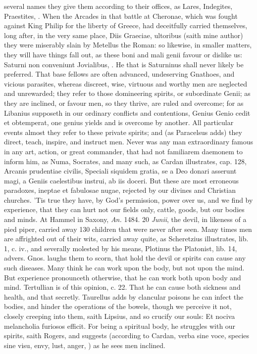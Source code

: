 {{several names they give them according to their offices, as Lares,
Indegites, Praestites, \etc{}. When the Arcades in that battle at Cheronae,
which was fought against King Philip for the liberty of Greece, had
deceitfully carried themselves, long after, in the very same place,
Diis Graeciae, ultoribus (saith mine author) they were miserably slain
by Metellus the Roman: so likewise, in smaller matters, they will have
things fall out, as these boni and mali genii favour or dislike us:
Saturni non conveniunt Jovialibus, \etc{}. He that is Saturninus shall
never likely be preferred. That base fellows are often advanced,
undeserving Gnathoes, and vicious parasites, whereas discreet, wise,
virtuous and worthy men are neglected and unrewarded; they refer to
those domineering spirits, or subordinate Genii; as they are inclined,
or favour men, so they thrive, are ruled and overcome; for as
Libanius supposeth in our ordinary conflicts and contentions,
Genius Genio cedit et obtemperat, one genius yields and is overcome by
another. All particular events almost they refer to these private
spirits; and (as Paracelsus adds) they direct, teach, inspire, and
instruct men. Never was any man extraordinary famous in any art,
action, or great commander, that had not familiarem daemonem to inform
him, as Numa, Socrates, and many such, as Cardan illustrates, cap. 128,
Arcanis prudentiae civilis,  Speciali siquidem gratia, se a Deo
donari asserunt magi, a Geniis caelestibus instrui, ab iis doceri. But
these are most erroneous paradoxes, ineptae et fabulosae nugae,
rejected by our divines and Christian churches. 'Tis true they have, by
God's permission, power over us, and we find by experience, that they
can hurt not our fields only, cattle, goods, but our bodies and
minds. At Hammel in Saxony, \emph{An.} 1484. 20 \emph{Junii}, the devil, in
likeness of a pied piper, carried away 130 children that were never
after seen. Many times men are affrighted out of their wits,
carried away quite, as Scheretzius illustrates, lib. 1, c. iv., and
severally molested by his means, Plotinus the Platonist, lib. 14,
advers. Gnos. laughs them to scorn, that hold the devil or spirits can
cause any such diseases. Many think he can work upon the body, but not
upon the mind. But experience pronounceth otherwise, that he can work
both upon body and mind. Tertullian is of this opinion, c. 22.
That he can cause both sickness and health, and that secretly.
Taurellus adds by clancular poisons he can infect the bodies, and
hinder the operations of the bowels, though we perceive it not, closely
creeping into them, saith Lipsius, and so crucify our souls: Et
nociva melancholia furiosos efficit. For being a spiritual body, he
struggles with our spirits, saith Rogers, and suggests (according to
Cardan, verba sine voce, species sine visu, envy, lust, anger,
\etc{}) as he sees men inclined.

}}
